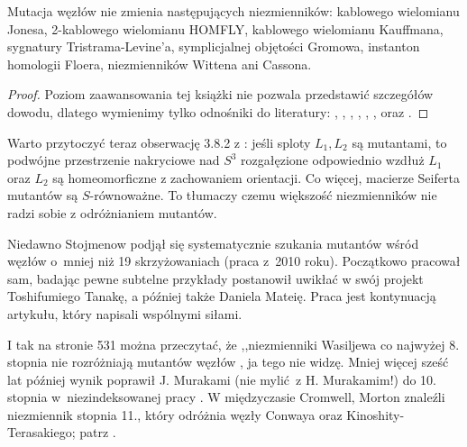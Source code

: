 \begin{proposition}
    Mutacja węzłów nie zmienia następujących niezmienników:
    kablowego wielomianu Jonesa, %
    2-kablowego wielomianu HOMFLY, %
    kablowego wielomianu Kauffmana, %
    sygnatury Tristrama-Levine'a, %
    symplicjalnej objętości Gromowa, %
    instanton homologii Floera, %
    niezmienników Wittena %
    ani Cassona. %
\end{proposition}

\begin{proof}
    Poziom zaawansowania tej książki nie pozwala przedstawić szczegółów dowodu, dlatego wymienimy tylko odnośniki do literatury: \cite{menasco91}, \cite{przytycki89}, \cite{lipson87}, \cite{cooper99}, \cite{ruberman87}, \cite{ruberman99}, \cite{rong94} oraz \cite{kirk89}.
\end{proof}

Warto przytoczyć teraz obserwację 3.8.2 z \cite[s. 43]{kawauchi96}: jeśli sploty $L_1, L_2$ są mutantami, to podwójne przestrzenie nakryciowe nad $S^3$ rozgałęzione odpowiednio wzdłuż $L_1$ oraz $L_2$ są homeomorficzne z zachowaniem orientacji.
Co więcej, macierze Seiferta mutantów są $S$-równoważne.
To tłumaczy czemu większość niezmienników nie radzi sobie z odróżnianiem mutantów.

Niedawno Stojmenow podjął się systematycznie szukania mutantów wśród węzłów o~mniej niż 19 skrzyżowaniach (praca \cite{stoimenow10} z~2010 roku).
Początkowo pracował sam, badając pewne subtelne przykłady postanowił uwikłać w swój projekt Toshifumiego Tanakę, a później także Daniela Mateię.
Praca \cite{stoimenow10} jest kontynuacją artykułu, który napisali wspólnymi siłami.

I tak na stronie 531 można przeczytać, że ,,niezmienniki Wasiljewa co najwyżej 8. stopnia nie rozróżniają mutantów węzłów \cite{chmutov94}, ja tego nie widzę.
Mniej więcej sześć lat później wynik poprawił J. Murakami (nie mylić z H. Murakamim!) do 10. stopnia w~niezindeksowanej pracy \cite{murakami99}.
W międzyczasie Cromwell, Morton znaleźli niezmiennik stopnia 11., który odróżnia węzły Conwaya oraz Kinoshity-Terasakiego; patrz \cite{cromwell96}.

